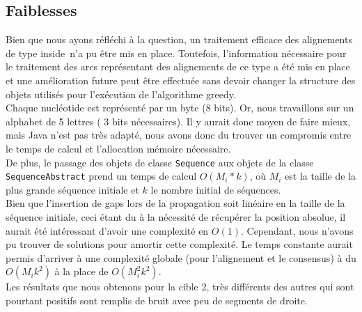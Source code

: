 \subsection{Faiblesses}

Bien que nous ayons réfléchi à la question, un traitement efficace des alignements de type \og inside\fg~n'a pu être mis en place. Toutefois, l'information nécessaire pour le traitement des arcs représentant des alignements de ce type a été mis en place et une amélioration future peut être effectuée sans devoir changer la structure des objets utilisés pour l'exécution de l'algorithme greedy.\\

Chaque nucléotide est représenté par un byte (8 bits). Or, nous travaillons sur un alphabet de 5 lettres ( 3 bits nécessaires). Il y aurait donc moyen de faire mieux, mais Java n'est pas très adapté, nous avons donc du trouver un compromis entre le temps de calcul et l'allocation mémoire nécessaire.\\

De plus, le passage des objets de classe \verb|Sequence| aux objets de la classe
\verb|SequenceAbstract| prend un temps de calcul $O(M_{i} * k)$, où $M_{i}$ est
la taille de la plus grande séquence initiale et $k$ le nombre initial de
séquences.\\

Bien que l'insertion de gaps lors de la propagation soit
linéaire en la taille de la séquence initiale, ceci étant du à la nécessité de
récupérer la position absolue, il aurait été intéressant d'avoir une complexité
en $O(1)$. Cependant, nous n'avons pu trouver de solutions pour amortir cette
complexité. Le temps constante aurait permis d'arriver à une complexité globale
(pour l'alignement et le consensus) à du $O(M_{i} k ^{2})$ à la place de
$O(M_{i}^{2} k^{2})$.\\

Les résultats que nous obtenons pour la cible 2, très différents des autres qui
sont pourtant positifs sont remplis de bruit avec peu de segments de droite.
